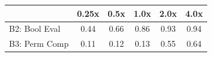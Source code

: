 \begin{tabular}{lccccc}
\toprule
 & 0.25x & 0.5x & 1.0x & 2.0x & 4.0x \\
\midrule
B2: Bool Eval & 0.44 & 0.66 & 0.86 & 0.93 & 0.94 \\
B3: Perm Comp & 0.11 & 0.12 & 0.13 & 0.55 & 0.64 \\
\bottomrule
\end{tabular}
